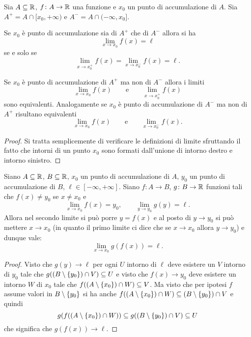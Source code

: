 \begin{theorem}%
\mymark{*}%
Sia $A\subseteq {\mathbb R}$, $f\colon A \to {\mathbb R}$ una funzione e $x_0$ un punto di accumulazione
di $A$. Sia $A^+ = A \cap [x_0,+\infty)$ e $A^- = A \cap (-\infty, x_0]$.

Se $x_0$ è punto di accumulazione sia di $A^+$ che di $A^-$
allora si ha
\[
  \lim_{x\to x_0} f(x) = \ell
\]
se e solo se
\[
  \lim_{x\to x_0^+} f(x) = \lim_{x\to x_0^-} f(x) = \ell.
\]

Se $x_0$ è punto di accumulazione di $A^+$ ma non di $A^-$ allora
i limiti
\[
  \lim_{x\to x_0} f(x) \qquad \text{e}\qquad \lim_{x\to x_0^+} f(x)
\]
sono equivalenti. Analogamente se $x_0$ è punto di accumulazione
di $A^-$ ma non di $A^+$ risultano equivalenti
\[
  \lim_{x\to x_0} f(x) \qquad \text{e}\qquad \lim_{x\to x_0^-} f(x).
\]
\end{theorem}
%
\begin{proof}
Si tratta semplicemente di verificare le definizioni di limite sfruttando il fatto che intorni di un punto $x_0$ sono formati dall'unione di intorno destro e intorno sinistro.
\end{proof}

\begin{theorem}
\label{th:limite_composta}
Siano $A\subseteq {\mathbb R}$, $B\subseteq {\mathbb R}$,
$x_0$ un punto di accumulazione di $A$,
$y_0$ un punto di accumulazione di $B$,
$\ell\in [-\infty,+\infty]$.
Siano $f\colon A \to B$, $g\colon B\to {\mathbb R}$
funzioni tali che $f(x)\neq y_0$ se $x\neq x_0$ e 
\[
  \lim_{x\to x_0} f(x) = y_0,
\qquad
  \lim_{y\to y_0} g(y) = \ell.
\]
Allora nel secondo limite si può porre $y=f(x)$ e al posto di $y\to y_0$ 
si può mettere $x\to x_0$ (in quanto il primo limite ci dice che se $x\to x_0$ 
allora $y\to y_0$) e dunque vale:
\[
 \lim_{x\to x_0} g(f(x)) = \ell.
\]
\end{theorem}
%
\begin{proof}
Visto che $g(y)\to \ell$
per ogni $U$ intorno di $\ell$ deve esistere un $V$ intorno di $y_0$
tale che $g((B\setminus{\left\{ y_0 \right\}})\cap V) \subseteq U$
e visto  che $f(x)\to y_0$ deve esistere un intorno $W$ di $x_0$
tale che $f((A\setminus{\left\{ x_0 \right\}})\cap W) \subseteq V$.
Ma visto che per ipotesi $f$ assume valori in $B\setminus{\left\{ y_0 \right\}}$
si ha anche $f((A\setminus{\left\{ x_0 \right\}})\cap W)\subseteq (B\setminus{\left\{ y_0 \right\}}) \cap V$
e quindi
\[
  g(f((A\setminus{\left\{ x_0 \right\}})\cap W)) \subseteq g((B\setminus {\left\{ y_0 \right\}}) \cap V)
  \subseteq U
\]
che significa che $g(f(x)) \to \ell$.
\end{proof}

